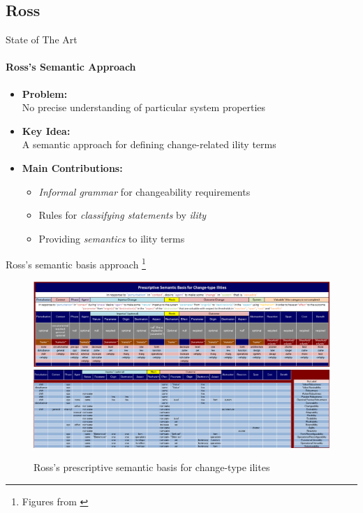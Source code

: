 \documentclass[xcolor=x11names,compress]{beamer}
\renewcommand{\(}{\begin{columns}}
\renewcommand{\)}{\end{columns}}
\newcommand{\<}[1]{\begin{column}{#1}}
\renewcommand{\>}{\end{column}}
\begin{document}
\subsection{Ross}
\begin{frame}{State of The Art}
\framesubtitle{Ross's Semantic Approach \cite{Ross:changeability}}
\begin{itemize}
\item \textbf{Problem:}\\No precise understanding of particular system properties
\item \textbf{Key Idea:} \\A semantic approach for defining change-related ility terms
\item \textbf{Main Contributions:}
\begin{itemize}
\item {\em Informal grammar} for changeability requirements
\item Rules for {\em classifying statements} by {\em ility}
\item Providing {\em semantics} to ility terms
\end{itemize}
\end{itemize}
\end{frame}


\begin{frame}{Ross's semantic basis approach \footnote{Figures from \cite{Ross:changeability}}}
\begin{figure}
\includegraphics[scale=0.22]{figures/semantic}
\vspace{0.4cm}
\includegraphics[scale=0.22]{figures/usesemantic}
\caption{Ross's prescriptive semantic basis for change-type ilites}
\end{figure}
\end{frame}
\end{document}

